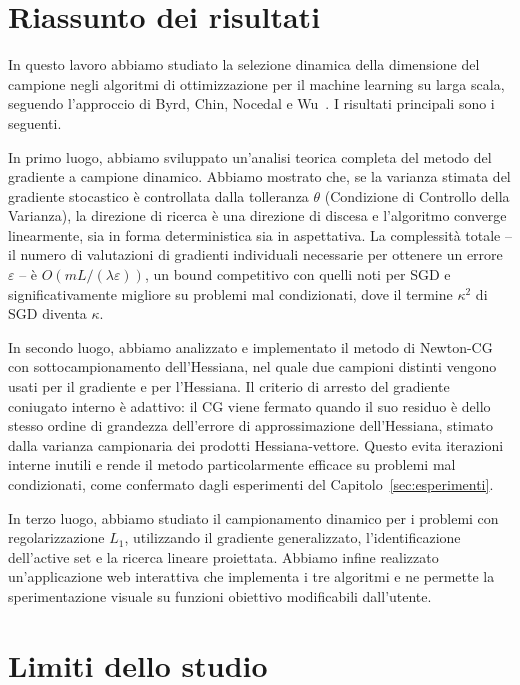 \documentclass[italian, a4paper, twoside, binding=6mm]{sapthesis}
\begin{document}
\section{Riassunto dei risultati}

In questo lavoro abbiamo studiato la selezione dinamica della dimensione
del campione negli algoritmi di ottimizzazione per il machine learning su
larga scala, seguendo l'approccio di Byrd, Chin, Nocedal e Wu~\cite{byrd2012}.
I risultati principali sono i seguenti.

In primo luogo, abbiamo sviluppato un'analisi teorica completa del metodo del
gradiente a campione dinamico. Abbiamo mostrato che, se la varianza stimata
del gradiente stocastico è controllata dalla tolleranza $\theta$ (Condizione di
Controllo della Varianza), la direzione di ricerca è una direzione di discesa e
l'algoritmo converge linearmente, sia in forma deterministica sia in
aspettativa. La complessità totale -- il numero di valutazioni di gradienti
individuali necessarie per ottenere un errore $\varepsilon$ -- è
$O(m L/(\lambda\varepsilon))$, un bound competitivo con quelli noti per SGD e
significativamente migliore su problemi mal condizionati, dove il termine
$\kappa^2$ di SGD diventa $\kappa$.

In secondo luogo, abbiamo analizzato e implementato il metodo di Newton-CG
con sottocampionamento dell'Hessiana, nel quale due campioni distinti
vengono usati per il gradiente e per l'Hessiana. Il criterio di arresto del
gradiente coniugato interno è adattivo: il CG viene fermato quando il suo
residuo è dello stesso ordine di grandezza dell'errore di approssimazione
dell'Hessiana, stimato dalla varianza campionaria dei prodotti
Hessiana-vettore. Questo evita iterazioni interne inutili e rende il metodo
particolarmente efficace su problemi mal condizionati, come confermato dagli
esperimenti del Capitolo~\ref{sec:esperimenti}.

In terzo luogo, abbiamo studiato il campionamento dinamico per i problemi con
regolarizzazione $L_1$, utilizzando il gradiente generalizzato, l'identificazione
dell'active set e la ricerca lineare proiettata. Abbiamo infine realizzato
un'applicazione web interattiva che implementa i tre algoritmi e ne permette la
sperimentazione visuale su funzioni obiettivo modificabili dall'utente.

\section{Limiti dello studio}
\end{document}
